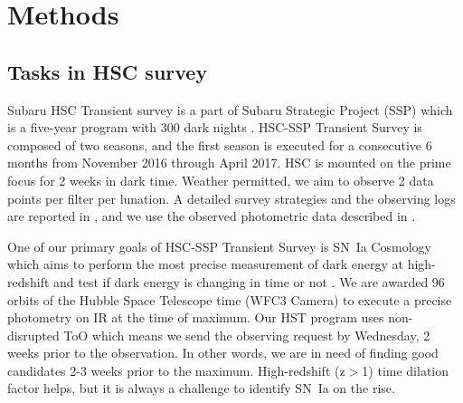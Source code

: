 \documentclass[useamsfonts]{pasj01}
\begin{document}
%
\section{Methods}
\subsection{Tasks in HSC survey}
\label{sec:tasks}
Subaru HSC Transient survey is a part of Subaru Strategic Project (SSP) which is a five-year program with 300 dark nights \citep{aihara18a,miyazaki18a}.
HSC-SSP Transient Survey is composed of two seasons, and the first season is executed for a consecutive 6 months from November 2016 through April 2017.
HSC is mounted on the prime focus for 2 weeks in dark time.   
Weather permitted, we aim to observe 2 data points per filter per lunation.
A detailed survey strategies and the observing logs are reported in \citet{yasuda19a}, and we use the observed photometric data described in \citet{yasuda19a}.

One of our primary goals of HSC-SSP Transient Survey is SN~Ia Cosmology which aims to perform the most precise measurement of dark energy at high-redshift and test if dark energy is changing in time or not \citep{linder03b}.
We are awarded 96 orbits of the Hubble Space Telescope time (WFC3 Camera) to execute a precise photometry on IR at the time of maximum.
Our HST program uses non-disrupted ToO which means we send the observing request by Wednesday, 2 weeks prior to the observation.
In other words, we are in need of finding good candidates 2-3 weeks prior to the maximum.  High-redshift (z$>$1) time dilation factor helps, but it is always a challenge to identify SN~Ia on the rise.
\end{document}
